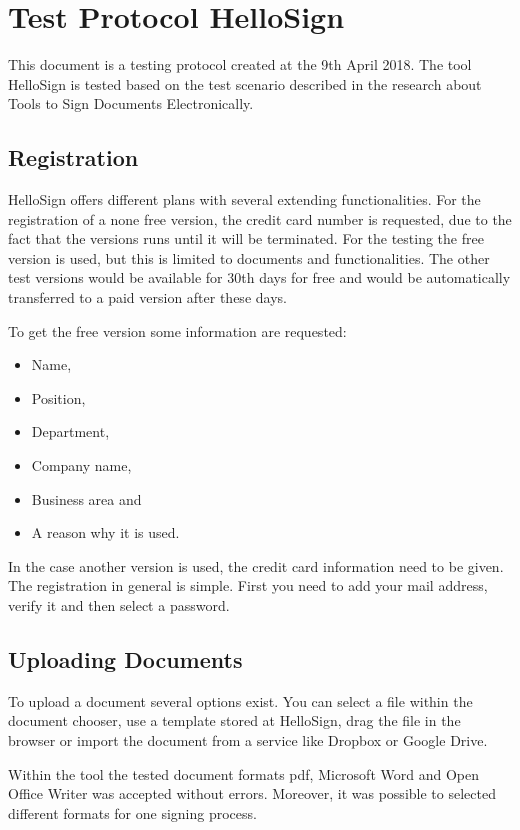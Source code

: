 \section{Test Protocol HelloSign} \label{sec:hellosign}
This document is a testing protocol created at the 9th April 2018. The tool HelloSign is tested based on the test scenario described in the research about Tools to Sign Documents Electronically.

\subsection{Registration}
HelloSign offers different plans with several extending functionalities. For the registration of a none free version, the credit card number is requested, due to the fact that the versions runs until it will be terminated. For the testing the free version is used, but this is limited to documents and functionalities. The other test versions would be available for 30th days for free and would be automatically transferred to a paid version after these days.

To get the free version some information are requested:
\begin{itemize}
	\item Name,
	\item Position,
	\item Department,
	\item Company name,
	\item Business area and
	\item A reason why it is used.
\end{itemize}
In the case another version is used, the credit card information need to be given. \newline
The registration in general is simple. First you need to add your mail address, verify it and then select a password.

\subsection{Uploading Documents}
To upload a document several options exist. You can select a file within the document chooser, use a template stored at HelloSign, drag the file in the browser or import the document from a service like Dropbox or Google Drive.

Within the tool the tested document formats \gls{pdf}, Microsoft Word and Open Office Writer was accepted without errors. Moreover, it was possible to selected different formats for one signing process.


